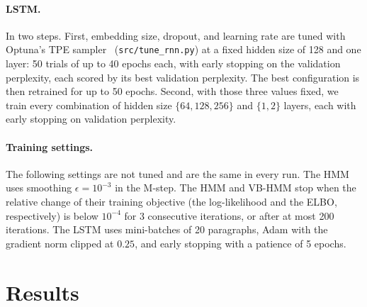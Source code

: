 \documentclass[11pt]{article}
\begin{document}
\paragraph{LSTM.} In two steps. First, embedding size, dropout, and
learning rate are tuned with Optuna's TPE sampler~\cite{akiba2019}
(\texttt{src/tune\_rnn.py}) at a fixed hidden size of 128 and one layer:
50 trials of up to 40 epochs each, with early stopping on the validation perplexity, each
scored by its best validation perplexity. The best configuration is then retrained for up
to 50 epochs. Second, with those three values
fixed, we train every combination of hidden size $\{64, 128, 256\}$ and
$\{1, 2\}$ layers, each with early stopping on validation perplexity.

\paragraph{Training settings.} The following settings are not tuned and
are the same in every run. The HMM uses smoothing $\epsilon = 10^{-3}$
in the M-step. The HMM and VB-HMM stop when the relative change of their
training objective (the log-likelihood and the ELBO, respectively) is
below $10^{-4}$ for 3 consecutive iterations, or after at most 200
iterations. The LSTM uses mini-batches of 20 paragraphs, Adam with the
gradient norm clipped at $0.25$, and early stopping with a patience of 5
epochs.

\section{Results}
\end{document}
